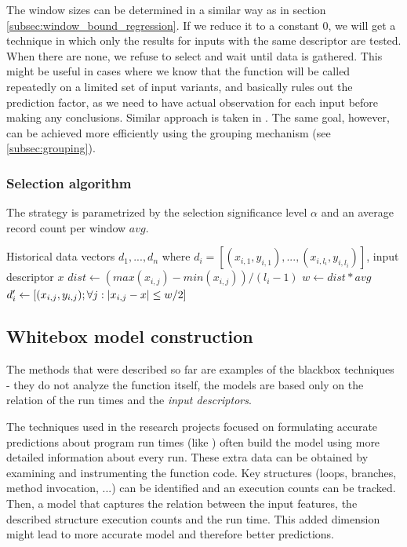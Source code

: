 The window sizes can be determined in a similar way as in section \ref{subsec:window_bound_regression}. If we reduce it to a constant 0, we will get a technique in which only the results for inputs with the same descriptor are tested. When there are none, we refuse to select and wait until data is gathered. This might be useful in cases where we know that the function will be called repeatedly on a limited set of input variants, and basically rules out the prediction factor, as we need to have actual observation for each input before making any conclusions. Similar approach is taken in \cite{bulej_performance_2012}. The same goal, however, can be achieved more efficiently using the grouping mechanism (see \ref{subsec:grouping}).

\subsubsection{Selection algorithm}

The strategy is parametrized by the selection significance level $\alpha$ and an average record count per window $avg$.

\begin{algorithmic}[1] %
	\INPUT Historical data vectors $d_1,...,d_n$ where $d_i = [(x_{i,1}, y_{i,1}),...,(x_{i,l_i}, y_{i,l_i})]$, input descriptor $x$
	\State $dist \gets (max(x_{i,j}) - min(x_{i,j})) / (l_i-1)$
	\State $w \gets dist * avg$
	\State $d'_i \gets [(x_{i,j}, y_{i, j}); \forall j: \left|{x_{i,j} - x}\right| \leq w/2]$
	\EndFor
	\State {}
\end{algorithmic}

\subsection{Whitebox model construction}

The methods that were described so far are examples of the blackbox techniques - they do not analyze the function itself, the models are based only on the relation of the run times and the \textit{input descriptors}. 

The techniques used in the research projects focused on formulating accurate predictions about program run times (like \cite{goldsmith_measuring_2007,chun_mantis:_2010,huang_predicting_2010}) often build the model using more detailed information about every run. These extra data can be obtained by examining and instrumenting the function code. Key structures (loops, branches, method invocation, ...) can be identified and an execution counts can be tracked. Then, a model that captures the relation between the input features, the described structure execution counts and the run time. This added dimension might lead to more accurate model and therefore better predictions.

